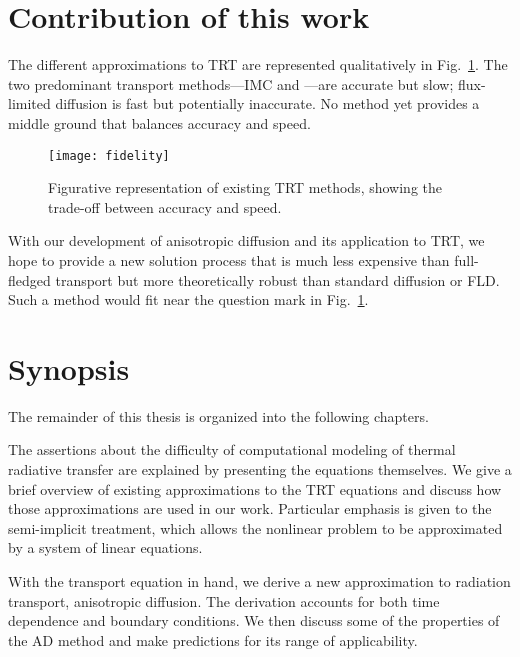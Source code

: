 \section{Contribution of this work}

The different approximations to TRT are represented qualitatively in
Fig.~\ref{fig:fidelity}. The two predominant transport methods---IMC and
\SN---are
accurate but slow; flux-limited diffusion is fast but potentially
inaccurate. No method yet provides a middle ground that balances accuracy and
speed.

\begin{figure}[htb]
  \centering
  \texttt{[image: fidelity]}
  \caption{Figurative representation of existing TRT methods, showing the
  trade-off between accuracy and speed.}
  \label{fig:fidelity}
\end{figure}

With our development of anisotropic diffusion and its application to TRT, we
hope to provide a new solution process that is much less expensive than
full-fledged transport but more theoretically robust than standard diffusion or
FLD. Such a method would fit near the question mark in
Fig.~\ref{fig:fidelity}.

\section{Synopsis}

The remainder of this thesis is organized into the following chapters.

The assertions about the difficulty of computational modeling of thermal
radiative transfer are explained by presenting the equations themselves. We give
a brief overview of existing approximations to the TRT equations and discuss how
those approximations are used in our work. Particular emphasis is given to the
semi-implicit treatment, which allows the nonlinear problem to be approximated
by a system of linear equations.

With the transport equation in hand, we derive a new approximation to radiation
transport, anisotropic diffusion. The derivation accounts for both time
dependence and boundary conditions. We then discuss some of the properties of
the AD method and make predictions for its range of applicability.

